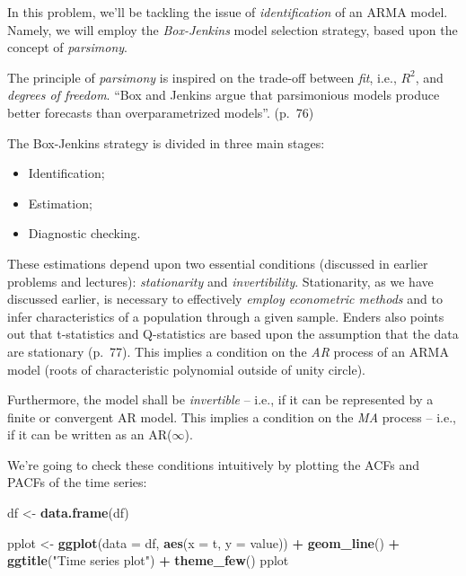 \documentclass[11pt, a4paper]{report}
\newenvironment{Shaded}{\begin{snugshade}}{\end{snugshade}}
\newcommand{\DataTypeTok}[1]{\textcolor[rgb]{0.13,0.29,0.53}{#1}}
\newcommand{\KeywordTok}[1]{\textcolor[rgb]{0.13,0.29,0.53}{\textbf{#1}}}
\newcommand{\NormalTok}[1]{#1}
\newcommand{\OperatorTok}[1]{\textcolor[rgb]{0.81,0.36,0.00}{\textbf{#1}}}
\newcommand{\StringTok}[1]{\textcolor[rgb]{0.31,0.60,0.02}{#1}}
\theoremstyle{plain}
\theoremstyle{plain}
\theoremstyle{remark}
\begin{document}
In this problem, we'll be tackling the issue of \emph{identification} of
an ARMA model. Namely, we will employ the \emph{Box-Jenkins} model
selection strategy, based upon the concept of \emph{parsimony}.

The principle of \emph{parsimony} is inspired on the trade-off between
\emph{fit}, i.e., \(R^2\), and \emph{degrees of freedom}. ``Box and
Jenkins argue that parsimonious models produce better forecasts than
overparametrized models''. (p.~76)

The Box-Jenkins strategy is divided in three main stages:

\begin{itemize}
	\item Identification;
	\item Estimation;
	\item Diagnostic checking.
\end{itemize}

These estimations depend upon two essential conditions (discussed in
earlier problems and lectures): \emph{stationarity} and
\emph{invertibility}. Stationarity, as we have discussed earlier, is
necessary to effectively \emph{employ econometric methods} and to infer
characteristics of a population through a given sample. Enders also
points out that t-statistics and Q-statistics are based upon the
assumption that the data are stationary (p.~77). This implies a
condition on the \emph{AR} process of an ARMA model (roots of
characteristic polynomial outside of unity circle).

Furthermore, the model shall be \emph{invertible} -- i.e., if it can be
represented by a finite or convergent AR model. This implies a condition
on the \emph{MA} process -- i.e., if it can be written as an
AR(\(\infty\)).

We're going to check these conditions intuitively by plotting the ACFs
and PACFs of the time series:

\begin{Shaded}
	\begin{Highlighting}[]
		\NormalTok{df <-}\StringTok{ }\KeywordTok{data.frame}\NormalTok{(df)}
		
		\NormalTok{pplot <-}\StringTok{ }\KeywordTok{ggplot}\NormalTok{(}\DataTypeTok{data =}\NormalTok{ df, }\KeywordTok{aes}\NormalTok{(}\DataTypeTok{x =}\NormalTok{ t, }\DataTypeTok{y =}\NormalTok{ value)) }\OperatorTok{+}\StringTok{ }\KeywordTok{geom_line}\NormalTok{() }\OperatorTok{+}\StringTok{ }
		\StringTok{    }\KeywordTok{ggtitle}\NormalTok{(}\StringTok{"Time series plot"}\NormalTok{) }\OperatorTok{+}\StringTok{ }\KeywordTok{theme_few}\NormalTok{()}
		\NormalTok{pplot}
	\end{Highlighting}
\end{Shaded}
\end{document}
